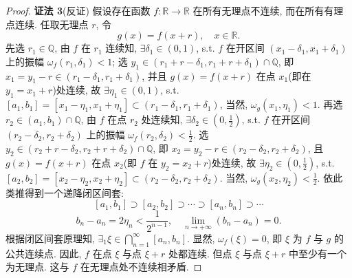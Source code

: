 \begin{proof}
\textbf{证法 3}\quad (反证) 假设存在函数 $f: \mathbb{R} \to \mathbb{R}$ 在所有无理点不连续, 而在所有有理点连续. 任取无理点 $r$, 令
\[
g(x) = f(x + r),\quad x \in \mathbb{R}.
\]
先选 $r_1 \in \mathbb{Q}$, 由 $f$ 在 $r_1$ 连续知, $\exists \delta_1 \in (0, 1)$, s.t. $f$ 在开区间 $(x_1 - \delta_1, x_1 + \delta_1)$ 上的振幅 $\omega_f(r_1, \delta_1) < 1$; 选 $y_1 \in (r_1 + r - \delta_1, r_1 + r + \delta_1) \cap \mathbb{Q}$, 即 $x_1 = y_1 - r \in (r_1 - \delta_1, r_1 + \delta_1)$, 并且 $g(x) = f(x + r)$ 在点 $x_1$(即在 $y_1 = x_1 + r$)处连续, 故 $\exists \eta_1 \in (0, 1)$, s.t. $[a_1, b_1] = [x_1 - \eta_1, x_1 + \eta_1] \subset (r_1 - \delta_1, r_1 + \delta_1)$, 当然, $\omega_g(x_1, \eta_1) < 1$. 再选 $r_2 \in (a_1, b_1) \cap \mathbb{Q}$, 由 $f$ 在点 $r_2$ 处连续知, $\exists \delta_2 \in \left(0, \frac{1}{2}\right)$, s.t. $f$ 在开区间 $(r_2 - \delta_2, r_2 + \delta_2)$ 上的振幅 $\omega_f(r_2, \delta_2) < \frac{1}{2}$. 选 $y_2 \in (r_2 + r - \delta_2, r_2 + r + \delta_2) \cap \mathbb{Q}$, 即 $x_2 = y_2 - r \in (r_2 - \delta_2, r_2 + \delta_2)$, 且 $g(x) = f(x + r)$ 在点 $x_2$(即 $f$ 在 $y_2 = x_2 + r$)处连续, 故 $\exists \eta_2 \in \left(0, \frac{1}{2}\right)$, s.t. $[a_2, b_2] = [x_2 - \eta_2, x_2 + \eta_2] \subset (r_2 - \delta_2, r_2 + \delta_2)$. 当然, $\omega_g(x_2, \eta_2) < \frac{1}{2}$. 依此类推得到一个递降闭区间套:
\[
[a_1, b_1] \supset [a_2, b_2] \supset \cdots \supset [a_n, b_n] \supset \cdots
\]
\[
b_n - a_n = 2\eta_n < \frac{1}{2^{n-1}},\quad \lim_{n \to +\infty} (b_n - a_n) = 0.
\]
根据闭区间套原理知, $\exists_1 \xi \in \bigcap\limits_{n=1}^{\infty} [a_n, b_n]$. 显然, $\omega_f(\xi) = 0$, 即 $\xi$ 为 $f$ 与 $g$ 的公共连续点. 因此, $f$ 在点 $\xi$ 与点 $\xi + r$ 处都连续. 但点 $\xi$ 与点 $\xi + r$ 中至少有一个为无理点. 这与 $f$ 在无理点处不连续相矛盾.
\end{proof}

